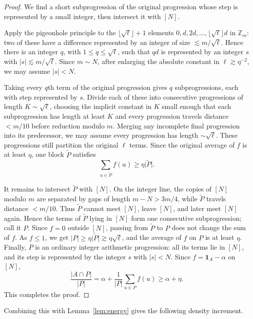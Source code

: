 \documentclass[11pt]{amsart}
\newcommand{\Z}{\mathbb{Z}}
\newcommand{\abs}[1]{\lvert#1\rvert}
\newcommand{\one}{\mathbf{1}}
\numberwithin{equation}{section}
\theoremstyle{plain}
\theoremstyle{remark}
\begin{document}
\begin{proof}
We find a short subprogression of the original progression whose step is
represented by a small integer, then intersect it with $[N]$.

Apply the pigeonhole principle to the $\lfloor\sqrt{\ell}\rfloor+1$ elements
$0,d,2d,\ldots,\lfloor\sqrt{\ell}\rfloor d$ in $\Z_m$: two of these have a
difference represented by an integer of size $\lesssim m/\sqrt{\ell}$. Hence
there is an integer $q$, with $1\le q\le\sqrt{\ell}$, such that $qd$ is
represented by an integer $s$ with $\abs{s}\lesssim m/\sqrt{\ell}$. Since
$m\sim N$, after enlarging the absolute constant in $\ell\gtrsim\eta^{-2}$, we
may assume $\abs{s}<N$.

Taking every $q$th term of the original progression gives $q$ subprogressions,
each with step represented by $s$. Divide each of these into consecutive progressions
of length $K\sim\sqrt{\ell}$, choosing the implicit constant in $K$ small
enough that each subprogression has length at least $K$ and every progression travels
distance $<m/10$ before reduction modulo $m$. Merging any incomplete final
progression into its predecessor, we may assume every progression has length
$\sim\sqrt{\ell}$. These progressions still partition the original $\ell$ terms.
Since the original average of $f$ is at least $\eta$, one block $\widetilde P$
satisfies
\[
    \sum_{u\in\widetilde P} f(u)\geq \eta\abs{\widetilde P}.
\]

It remains to intersect $\widetilde P$ with $[N]$. On the integer line, the
copies of $[N]$ modulo $m$ are separated by gaps of length $m-N>3m/4$, while
$\widetilde P$ travels distance $<m/10$. Thus $\widetilde P$ cannot meet
$[N]$, leave $[N]$, and later meet $[N]$ again. Hence the terms of
$\widetilde P$ lying in $[N]$ form one consecutive subprogression; call it
$P$. Since $f=0$ outside $[N]$, passing from $\widetilde P$ to $P$ does not
change the sum of $f$. As $f\leq1$, we get
$\abs{P}\geq\eta\abs{\widetilde P}\gtrsim\eta\sqrt{\ell}$, and the average of
$f$ on $P$ is at least $\eta$. Finally, $P$ is an ordinary integer arithmetic
progression: all its terms lie in $[N]$, and its step is represented by the
integer $s$ with $\abs{s}<N$. Since $f=\one_A-\alpha$ on $[N]$,
\[
    \frac{\abs{A\cap P}}{\abs{P}}
    =\alpha+\frac{1}{\abs{P}}\sum_{u\in P}f(u)
    \geq \alpha+\eta.
\]
This completes the proof.
\end{proof}

Combining this with Lemma~\ref{lem:energy} gives the following density increment.
\end{document}
